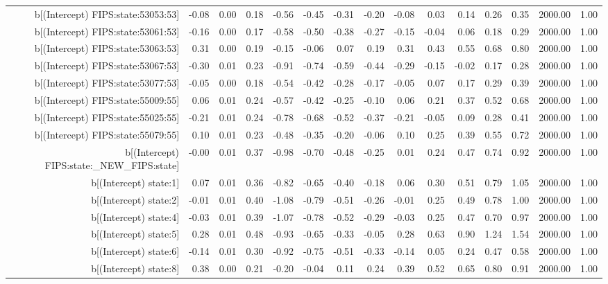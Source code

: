 \begin{table}[ht]
\begin{tabular}{rrrrrrrrrrrrrrr}
  b[(Intercept) FIPS:state:53053:53] & -0.08 & 0.00 & 0.18 & -0.56 & -0.45 & -0.31 & -0.20 & -0.08 & 0.03 & 0.14 & 0.26 & 0.35 & 2000.00 & 1.00 \\ 
  b[(Intercept) FIPS:state:53061:53] & -0.16 & 0.00 & 0.17 & -0.58 & -0.50 & -0.38 & -0.27 & -0.15 & -0.04 & 0.06 & 0.18 & 0.29 & 2000.00 & 1.00 \\ 
  b[(Intercept) FIPS:state:53063:53] & 0.31 & 0.00 & 0.19 & -0.15 & -0.06 & 0.07 & 0.19 & 0.31 & 0.43 & 0.55 & 0.68 & 0.80 & 2000.00 & 1.00 \\ 
  b[(Intercept) FIPS:state:53067:53] & -0.30 & 0.01 & 0.23 & -0.91 & -0.74 & -0.59 & -0.44 & -0.29 & -0.15 & -0.02 & 0.17 & 0.28 & 2000.00 & 1.00 \\ 
  b[(Intercept) FIPS:state:53077:53] & -0.05 & 0.00 & 0.18 & -0.54 & -0.42 & -0.28 & -0.17 & -0.05 & 0.07 & 0.17 & 0.29 & 0.39 & 2000.00 & 1.00 \\ 
  b[(Intercept) FIPS:state:55009:55] & 0.06 & 0.01 & 0.24 & -0.57 & -0.42 & -0.25 & -0.10 & 0.06 & 0.21 & 0.37 & 0.52 & 0.68 & 2000.00 & 1.00 \\ 
  b[(Intercept) FIPS:state:55025:55] & -0.21 & 0.01 & 0.24 & -0.78 & -0.68 & -0.52 & -0.37 & -0.21 & -0.05 & 0.09 & 0.28 & 0.41 & 2000.00 & 1.00 \\ 
  b[(Intercept) FIPS:state:55079:55] & 0.10 & 0.01 & 0.23 & -0.48 & -0.35 & -0.20 & -0.06 & 0.10 & 0.25 & 0.39 & 0.55 & 0.72 & 2000.00 & 1.00 \\ 
  b[(Intercept) FIPS:state:\_NEW\_FIPS:state] & -0.00 & 0.01 & 0.37 & -0.98 & -0.70 & -0.48 & -0.25 & 0.01 & 0.24 & 0.47 & 0.74 & 0.92 & 2000.00 & 1.00 \\ 
  b[(Intercept) state:1] & 0.07 & 0.01 & 0.36 & -0.82 & -0.65 & -0.40 & -0.18 & 0.06 & 0.30 & 0.51 & 0.79 & 1.05 & 2000.00 & 1.00 \\ 
  b[(Intercept) state:2] & -0.01 & 0.01 & 0.40 & -1.08 & -0.79 & -0.51 & -0.26 & -0.01 & 0.25 & 0.49 & 0.78 & 1.00 & 2000.00 & 1.00 \\ 
  b[(Intercept) state:4] & -0.03 & 0.01 & 0.39 & -1.07 & -0.78 & -0.52 & -0.29 & -0.03 & 0.25 & 0.47 & 0.70 & 0.97 & 2000.00 & 1.00 \\ 
  b[(Intercept) state:5] & 0.28 & 0.01 & 0.48 & -0.93 & -0.65 & -0.33 & -0.05 & 0.28 & 0.63 & 0.90 & 1.24 & 1.54 & 2000.00 & 1.00 \\ 
  b[(Intercept) state:6] & -0.14 & 0.01 & 0.30 & -0.92 & -0.75 & -0.51 & -0.33 & -0.14 & 0.05 & 0.24 & 0.47 & 0.58 & 2000.00 & 1.00 \\ 
  b[(Intercept) state:8] & 0.38 & 0.00 & 0.21 & -0.20 & -0.04 & 0.11 & 0.24 & 0.39 & 0.52 & 0.65 & 0.80 & 0.91 & 2000.00 & 1.00 \\ 

\end{tabular}
\end{table}
